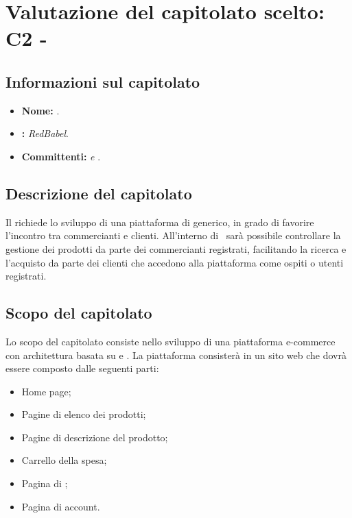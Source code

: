 \section{Valutazione del capitolato scelto: C2 - \NomeProgetto}\label{C2}
\subsection{Informazioni sul capitolato}
\begin{itemize}
	\item \textbf{Nome:} \textit{\NomeProgetto}.
	\item \textbf{:} \textit{RedBabel}.
	\item \textbf{Committenti:} \textit{\VT{} e \CR{}}.
\end{itemize}

\subsection{Descrizione del capitolato}
Il  richiede lo sviluppo di una piattaforma di  generico, in grado di favorire l'incontro tra commercianti e clienti. All'interno di \NomeProgetto\ sarà possibile controllare la gestione dei prodotti da parte dei commercianti registrati, facilitando la ricerca e l'acquisto da parte dei clienti che accedono alla piattaforma come ospiti o utenti registrati.

\subsection{Scopo del capitolato}
Lo scopo del capitolato consiste nello sviluppo di una piattaforma e-commerce con architettura basata su  e .
La piattaforma consisterà in un sito web che dovrà essere composto dalle seguenti parti:
\begin{itemize}
	\item Home page;
	\item Pagine di elenco dei prodotti;
	\item Pagine di descrizione del prodotto;
	\item Carrello della spesa;
	\item Pagina di ;
	\item Pagina di account.
\end{itemize}

